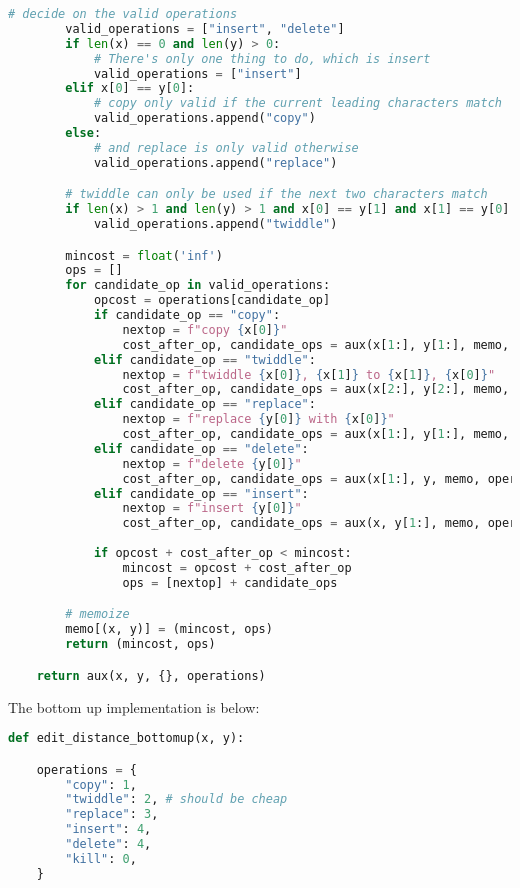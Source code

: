 \documentclass[]{book}
\theoremstyle{definition}
\begin{document}
\begin{enumerate}[label={\alph*.}]
\begin{lstlisting}[language=Python, caption=Edit Distance Top-Down Memoization, label=snip:editdistance-top]
        # decide on the valid operations
        valid_operations = ["insert", "delete"]
        if len(x) == 0 and len(y) > 0:
            # There's only one thing to do, which is insert
            valid_operations = ["insert"]
        elif x[0] == y[0]:
            # copy only valid if the current leading characters match
            valid_operations.append("copy")
        else:
            # and replace is only valid otherwise
            valid_operations.append("replace")

        # twiddle can only be used if the next two characters match
        if len(x) > 1 and len(y) > 1 and x[0] == y[1] and x[1] == y[0]:
            valid_operations.append("twiddle")

        mincost = float('inf')
        ops = []
        for candidate_op in valid_operations:
            opcost = operations[candidate_op]
            if candidate_op == "copy":
                nextop = f"copy {x[0]}"
                cost_after_op, candidate_ops = aux(x[1:], y[1:], memo, operations)
            elif candidate_op == "twiddle":
                nextop = f"twiddle {x[0]}, {x[1]} to {x[1]}, {x[0]}"
                cost_after_op, candidate_ops = aux(x[2:], y[2:], memo, operations)
            elif candidate_op == "replace":
                nextop = f"replace {y[0]} with {x[0]}"
                cost_after_op, candidate_ops = aux(x[1:], y[1:], memo, operations)
            elif candidate_op == "delete":
                nextop = f"delete {y[0]}"
                cost_after_op, candidate_ops = aux(x[1:], y, memo, operations)
            elif candidate_op == "insert":
                nextop = f"insert {y[0]}"
                cost_after_op, candidate_ops = aux(x, y[1:], memo, operations)
            
            if opcost + cost_after_op < mincost:
                mincost = opcost + cost_after_op
                ops = [nextop] + candidate_ops

        # memoize
        memo[(x, y)] = (mincost, ops)
        return (mincost, ops)

    return aux(x, y, {}, operations)\end{lstlisting}
        
        \clearpage
        The bottom up implementation is below:
        \begin{lstlisting}[language=Python, caption=Edit Distance Bottom-Up Memoization, label=snip:editdistance-bottomup]
def edit_distance_bottomup(x, y):

    operations = {
        "copy": 1,
        "twiddle": 2, # should be cheap
        "replace": 3,
        "insert": 4,
        "delete": 4,
        "kill": 0,
    }


\end{lstlisting}
\end{enumerate}
\end{document}
